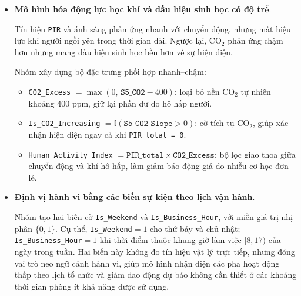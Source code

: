 \begin{itemize}
\begin{notebox}{Biến đổi lượng giác cho thời gian}
Do đó, nhóm sử dụng biến đổi lượng giác:
\begin{equation}
    x_{\sin}=\sin\left(\frac{2\pi t}{T}\right),\qquad x_{\cos}=\cos\left(\frac{2\pi t}{T}\right)
\end{equation}
với các chu kỳ tương ứng $T=24$ (giờ), $T=60$ (phút), $T=7$ (ngày trong tuần), tạo ra các biến \texttt{Hour\_sin}, \texttt{Hour\_cos}, \texttt{Minute\_sin}, \texttt{Minute\_cos}, \texttt{DayOfWeek\_sin}, \texttt{DayOfWeek\_cos}. Cách mã hóa này giúp ranh giới quyết định mượt tại các điểm giao thời.
\end{notebox}

    \item \textbf{Mô hình hóa động lực học khí và dấu hiệu sinh học có độ trễ}.

    Tín hiệu \texttt{PIR} và ánh sáng phản ứng nhanh với chuyển động, nhưng mất hiệu lực khi người ngồi yên trong thời gian dài. Ngược lại, CO$_2$ phản ứng chậm hơn nhưng mang dấu hiệu sinh học bền hơn về sự hiện diện.

    Nhóm xây dựng bộ đặc trưng phối hợp nhanh--chậm:
    \begin{itemize}
        \item \texttt{CO2\_Excess} $= \max(0,\,\texttt{S5\_CO2}-400)$: loại bỏ nền CO$_2$ tự nhiên khoảng 400 ppm, giữ lại phần dư do hô hấp người.
        \item \texttt{Is\_CO2\_Increasing} $= \mathbb{I}(\texttt{S5\_CO2\_Slope}>0)$: cờ tích tụ CO$_2$, giúp xác nhận hiện diện ngay cả khi \texttt{PIR\_total = 0}.
        \item \texttt{Human\_Activity\_Index} $= \texttt{PIR\_total}\times\texttt{CO2\_Excess}$: bộ lọc giao thoa giữa chuyển động và khí hô hấp, làm giảm báo động giả do nhiễu cơ học đơn lẻ.
    \end{itemize}

    \item \textbf{Định vị hành vi bằng các biến sự kiện theo lịch vận hành}.

    Nhóm tạo hai biến cờ \texttt{Is\_Weekend} và \texttt{Is\_Business\_Hour}, với miền giá trị nhị phân $\{0,1\}$. Cụ thể, \texttt{Is\_Weekend}$=1$ cho thứ bảy và chủ nhật; \texttt{Is\_Business\_Hour}$=1$ khi thời điểm thuộc khung giờ làm việc $[8,17)$ của ngày trong tuần. Hai biến này không đo tín hiệu vật lý trực tiếp, nhưng đóng vai trò neo ngữ cảnh hành vi, giúp mô hình nhận diện các pha hoạt động thấp theo lịch tổ chức và giảm dao động dự báo không cần thiết ở các khoảng thời gian phòng ít khả năng được sử dụng.
\end{itemize}

